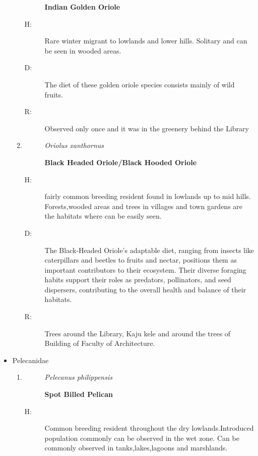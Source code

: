 \begin{itemize}
\begin{enumerate}
\begin{description}
\item[]%
\textbf{Indian Golden Oriole}%
\end{description}%
\begin{description}%
\item[H: ]%
Rare winter migrant to lowlands and lower hills. Solitary and can be seen in wooded areas.%
\item[D: ]%
The diet of these golden oriole species consists mainly of wild fruits. %
\item[R: ]%
Observed only once and it was in the greenery behind the Library%
\end{description}%
\item%
\begin{description}%
\item[]%
\textit{Oriolus xanthornus}%
\item[]%
\textbf{Black Headed Oriole/Black Hooded Oriole}%
\end{description}%
\begin{description}%
\item[H: ]%
fairly common breeding resident found in lowlands up to mid hills. Forests,wooded areas and trees in villages and town gardens are the habitats where can be easily seen.%
\item[D: ]%
The Black{-}Headed Oriole's adaptable diet, ranging from insects like caterpillars and beetles to fruits and nectar, positions them as important contributors to their ecosystem. Their diverse foraging habits support their roles as predators, pollinators, and seed dispersers, contributing to the overall health and balance of their habitats.%
\item[R: ]%
Trees around the Library, Kaju kele and around the trees of Building of Faculty of Architecture.%
\end{description}%
\end{enumerate}%
\item%
Pelecanidae%
\begin{enumerate}%
\item%
\begin{description}%
\item[]%
\textit{Pelecanus philippensis}%
\item[]%
\textbf{Spot Billed Pelican}%
\end{description}%
\begin{description}%
\item[H: ]%
Common breeding resident throughout the dry lowlands.Introduced population commonly can be observed in the wet zone.  Can be commonly observed in tanks,lakes,lagoons and marshlands.%

\end{description}
\end{enumerate}
\end{itemize}
